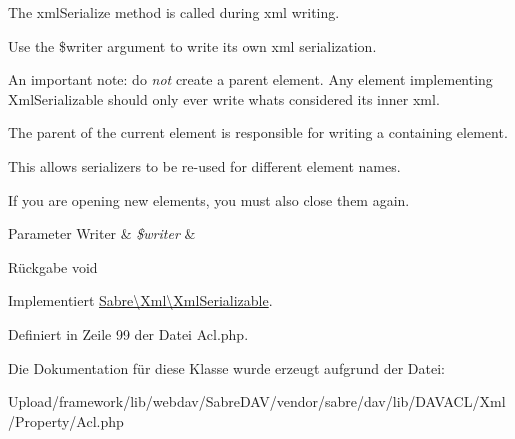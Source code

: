The xml\+Serialize method is called during xml writing.

Use the \$writer argument to write its own xml serialization.

An important note\+: do {\itshape not} create a parent element. Any element implementing Xml\+Serializable should only ever write what\textquotesingle{}s considered its \textquotesingle{}inner xml\textquotesingle{}.

The parent of the current element is responsible for writing a containing element.

This allows serializers to be re-\/used for different element names.

If you are opening new elements, you must also close them again.


\begin{DoxyParams}[1]{Parameter}
Writer & {\em \$writer} & \\
\hline
\end{DoxyParams}
\begin{DoxyReturn}{Rückgabe}
void 
\end{DoxyReturn}


Implementiert \mbox{\hyperlink{interface_sabre_1_1_xml_1_1_xml_serializable_aa78f3ee43aa699be8347181653a53d8c}{Sabre\textbackslash{}\+Xml\textbackslash{}\+Xml\+Serializable}}.



Definiert in Zeile 99 der Datei Acl.\+php.



Die Dokumentation für diese Klasse wurde erzeugt aufgrund der Datei\+:\begin{DoxyCompactItemize}
\item 
Upload/framework/lib/webdav/\+Sabre\+D\+A\+V/vendor/sabre/dav/lib/\+D\+A\+V\+A\+C\+L/\+Xml/\+Property/Acl.\+php\end{DoxyCompactItemize}
